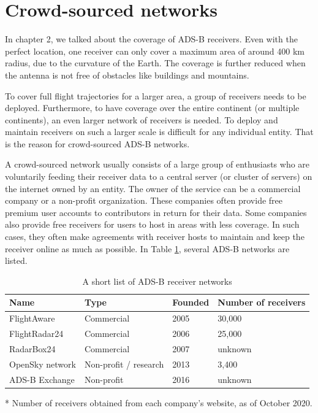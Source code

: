 \section{Crowd-sourced networks}

In chapter 2, we talked about the coverage of ADS-B receivers. Even with the perfect location, one receiver can only cover a maximum area of around 400 km radius, due to the curvature of the Earth. The coverage is further reduced when the antenna is not free of obstacles like buildings and mountains. 

To cover full flight trajectories for a larger area, a group of receivers needs to be deployed. Furthermore, to have coverage over the entire continent (or multiple continents), an even larger network of receivers is needed. To deploy and maintain receivers on such a larger scale is difficult for any individual entity. That is the reason for crowd-sourced ADS-B networks. 

A crowd-sourced network usually consists of a large group of enthusiasts who are voluntarily feeding their receiver data to a central server (or cluster of servers) on the internet owned by an entity. The owner of the service can be a commercial company or a non-profit organization. These companies often provide free premium user accounts to contributors in return for their data. Some companies also provide free receivers for users to host in areas with less coverage. In such cases, they often make agreements with receiver hosts to maintain and keep the receiver online as much as possible. In Table \ref{tb:adsb_networks}, several ADS-B networks are listed.

\begin{table}[ht]
\caption{A short list of ADS-B receiver networks}
\label{tb:adsb_networks}
\begin{threeparttable}
\begin{tabular}{|l|l|l|l|}
\hline
\textbf{Name} & \textbf{Type} & \textbf{Founded} & \textbf{Number of receivers} \\ \hline
FlightAware & Commercial & 2005 & 30,000\tnote{*} \\ \hline
FlightRadar24 & Commercial & 2006 & 25,000\tnote{*} \\ \hline
RadarBox24 & Commercial & 2007 & unknown \\ \hline
OpenSky network & Non-profit / research & 2013 & 3,400\tnote{*} \\ \hline
ADS-B Exchange & Non-profit & 2016 & unknown \\ \hline
\end{tabular}
\begin{tablenotes}
\item[*] Number of receivers obtained from each company's website, as of October 2020.
\end{tablenotes}
\end{threeparttable}    
\end{table}

